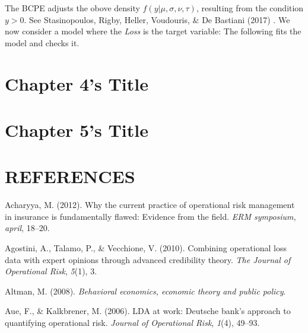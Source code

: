 \documentclass{DissertateUSU}
\begin{document}
The BCPE adjusts the obove density \(f(y|\mu,\sigma,\nu,\tau)\),
resulting from the condition \(y>0\). See Stasinopoulos, Rigby, Heller,
Voudouris, \& De Bastiani (2017) . We now consider a model where the
\emph{Loss} is the target variable: The following fits the model and
checks it.\medskip

\singlespacing

\FloatBarrier
\newpage
{}
\fancyhead[R]{\thepage}
\fancyfoot[C]{}

\chapter{Chapter 4's Title}

\FloatBarrier
\newpage
{}
\fancyhead[R]{\thepage}
\fancyfoot[C]{}

\chapter{Chapter 5's Title}

\FloatBarrier
\newpage
{}
\fancyhead[R]{\thepage}
\fancyfoot[C]{}

\chapter*{REFERENCES}

\setlength{\parindent}{-0.5in}
\setlength{\leftskip}{0.4in}
\setlength{\parskip}{6pt}

\noindent

\hypertarget{refs}{}
\leavevmode\hypertarget{ref-acharyya2012current}{}%
Acharyya, M. (2012). Why the current practice of operational risk
management in insurance is fundamentally flawed: Evidence from the
field. \emph{ERM symposium, april}, 18--20.

\leavevmode\hypertarget{ref-agostini2010combining}{}%
Agostini, A., Talamo, P., \& Vecchione, V. (2010). Combining operational
loss data with expert opinions through advanced credibility theory.
\emph{The Journal of Operational Risk}, \emph{5}(1), 3.

\leavevmode\hypertarget{ref-altman2008behavioral}{}%
Altman, M. (2008). \emph{Behavioral economics, economic theory and
public policy}.

\leavevmode\hypertarget{ref-aue2006lda}{}%
Aue, F., \& Kalkbrener, M. (2006). LDA at work: Deutsche bank's approach
to quantifying operational risk. \emph{Journal of Operational Risk},
\emph{1}(4), 49--93.
\end{document}
